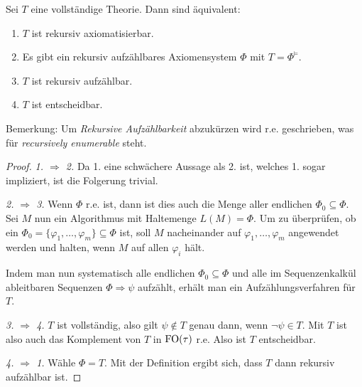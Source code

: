 \begin{satz}
	Sei $T$ eine vollständige Theorie. Dann sind äquivalent:
	\begin{enumerate}
		\item $T$ ist rekursiv axiomatisierbar.
		\item Es gibt ein rekursiv aufzählbares Axiomensystem $\Phi$ mit $T=\Phi^{\models}$.
		\item $T$ ist rekursiv aufzählbar.
		\item $T$ ist entscheidbar.
	\end{enumerate}
\end{satz}
Bemerkung: Um \textit{Rekursive Aufzählbarkeit} abzukürzen wird r.e. geschrieben, was für \textit{recursively enumerable} steht.
\begin{proof}
	\textit{1. $\Rightarrow$ 2.} Da 1. eine schwächere Aussage als 2. ist, welches 1. sogar impliziert, ist die Folgerung trivial.
	
	\textit{2. $\Rightarrow$ 3.} Wenn $\Phi$ r.e. ist, dann ist dies auch die Menge aller endlichen $\Phi_0\subseteq \Phi$. Sei $M$ nun ein Algorithmus mit Haltemenge $L(M)=\Phi$. Um zu überprüfen, ob ein $\Phi_0=\{\varphi_1,\dots,\varphi_m\}\subseteq \Phi$ ist, soll $M$ nacheinander auf $\varphi_1,\dots,\varphi_m$ angewendet werden und halten, wenn $M$ auf allen $\varphi_i$ hält.
	
	Indem man nun systematisch alle endlichen $\Phi_0\subseteq\Phi$ und alle im Sequenzenkalkül ableitbaren Sequenzen $\Phi\Rightarrow\psi$ aufzählt, erhält man ein Aufzählungsverfahren für $T$.
	
	\textit{3. $\Rightarrow$ 4.} $T$ ist vollständig, also gilt $\psi \notin T$ genau dann, wenn $\neg\psi\in T$. Mit $T$ ist also auch das Komplement von $T$ in $\operatorname{FO}(\tau)$ r.e. Also ist $T$ entscheidbar.
	
	\textit{4. $\Rightarrow$ 1.} Wähle $\Phi=T$. Mit der Definition ergibt sich, dass $T$ dann rekursiv aufzählbar ist.
\end{proof}

